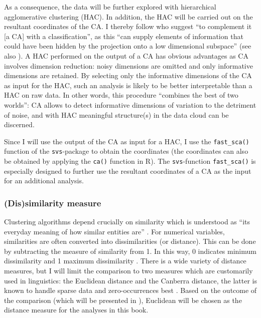 As a consequence, the data will be further explored with hierarchical agglomerative clustering (HAC). In addition, the HAC will be carried out on the resultant coordinates of the CA. I thereby follow \citet[335]{cuadras_correspondence_1993} who suggest “to complement it [a CA] with a classification”, as this “can supply elements of information that could have been hidden by the projection onto a low dimensional subspace” (see also \citealt[28]{ciampi_correspondence_2005}). A HAC performed on the output of a CA has obvious advantages as CA involves dimension reduction: noisy dimensions are omitted and only informative dimensions are retained. By selecting only the informative dimensions of the CA as input for the HAC, such an analysis is likely to be better interpretable than a HAC on raw data. In other words, this procedure ``combines the best of two worlds'': CA allows to detect informative dimensions of variation to the detriment of noise, and with HAC meaningful structure(s) in the data cloud can be discerned.

Since I will use the output of the CA as input for a HAC, I use the \texttt{fast\_sca()} function of the \texttt{svs}-package to obtain the coordinates (the coordinates can also be obtained by applying the \texttt{ca()} function in R). The \texttt{svs}-function \texttt{fast\_sca()} is especially designed to further use the resultant coordinates of a CA as the input for an additional analysis.

\subsubsection{(Dis)similarity measure}
\label{sec:3.7.2.1}
Clustering algorithms depend crucially on similarity which is understood as “its everyday meaning of how similar entities are” \citep[411]{glynn_cluster_2014}. For numerical variables, similarities are often converted into dissimilarities (or distance). This can be done by subtracting the measure of similarity from 1. In this way, 0 indicates minimum dissimilarity and 1 maximum dissimilarity \citep[415--416]{glynn_cluster_2014}. There is a wide variety of distance measures, but I will limit the comparison to two measures which are customarily used in linguistics: the Euclidean distance and the Canberra distance, the latter is known to handle sparse data and zero-occurrences best \citep[132]{divjak_structuring_2010}. Based on the outcome of the comparison (which will be presented in ), Euclidean will be chosen as the distance measure for the analyses in this book.

